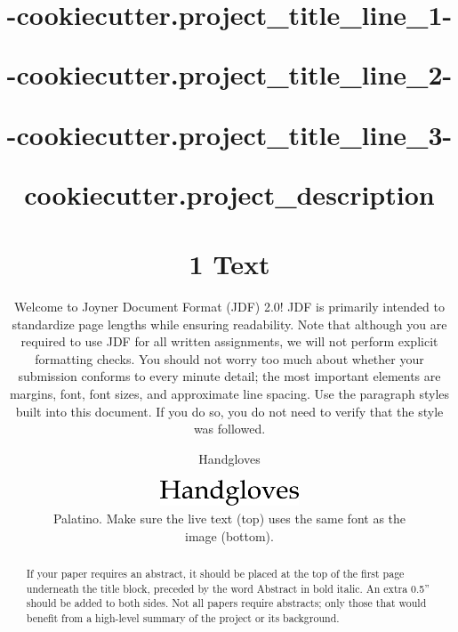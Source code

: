 

\title{
  {{-cookiecutter.project_title_line_1-}} \\

  {%
    {{-cookiecutter.project_title_line_2-}} \\
  {%

  {%
    {{-cookiecutter.project_title_line_3-}} \\
  {%
  }



\maketitle
\thispagestyle{fancy}

{{cookiecutter.project_description}}

% 

\begin{abstract}
If your paper requires an abstract, it should be placed at the top of the first page underneath the title block, preceded by the word Abstract in bold italic. An extra 0.5'' should be added to both sides. Not all papers require abstracts; only those that would benefit from a high-level summary of the project or its background.
\end{abstract}

\section*{1 Text}
Welcome to Joyner Document Format (JDF) 2.0! JDF is primarily intended to standardize page lengths while ensuring readability. Note that although you are required to use JDF for all written assignments, we will not perform explicit formatting checks. You should not worry too much about whether your submission conforms to every minute detail; the most important elements are margins, font, font sizes, and approximate line spacing. Use the paragraph styles built into this document. If you do so, you do not need to verify that the style was followed.

\Huge\centerline{Handgloves}\normalsize

\begin{figure}[H]
  \centering
  \includegraphics[scale=0.72]{figs/example-image1}
  \caption{Palatino. Make sure the live text (top) uses the same font as the image (bottom).}
  \label{fig::1}
\end{figure}

}}}}
